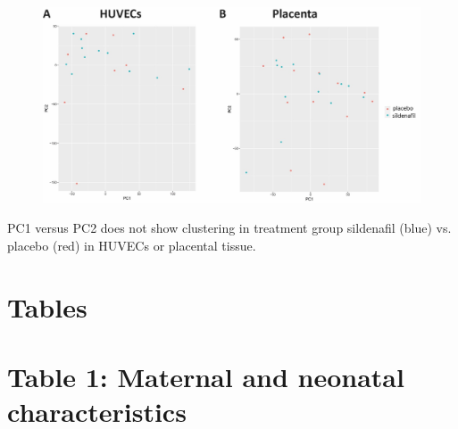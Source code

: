 \documentclass[authordate, empirical]{jote-new-article}
\begin{document}
	\begin{figure}
		\includegraphics[width=\linewidth]{media/image1.jpeg}

		\caption{}

		\label{fig:rId8}


	\end{figure}PC1 versus PC2 does not show clustering in treatment group sildenafil (blue) vs. placebo (red) in HUVECs or placental tissue.







	\section{Tables}







	\section{\textbf{Table 1: Maternal and neonatal characteristics }}
\end{document}
